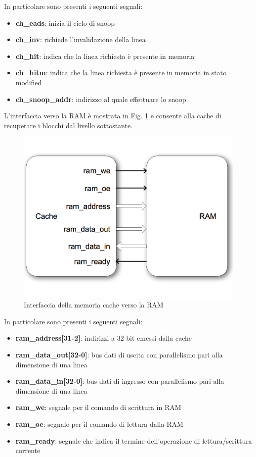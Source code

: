 In particolare sono presenti i seguenti segnali:
\begin{itemize}
\item \textbf{ch\_eads}: inizia il ciclo di snoop
\item \textbf{ch\_inv}: richiede l'invalidazione della linea
\item \textbf{ch\_hit}: indica che la linea richiesta \`e presente in memoria
\item \textbf{ch\_hitm}: indica che la linea richiesta \`e presente in memoria in stato modified
\item \textbf{ch\_snoop\_addr}: indirizzo al quale effettuare lo snoop
\end{itemize}


L'interfaccia verso la RAM \`e mostrata in Fig. \ref{fig:int_ram} e consente alla cache di recuperare i blocchi dal livello sottostante.\\

\begin{figure}[h!]
\centering
\includegraphics[width=\textwidth]{img/cache/ram.png}
\caption{Interfaccia della memoria cache verso la RAM}
\label{fig:int_ram}
\end{figure}

In particolare sono presenti i seguenti segnali:
\begin{itemize} %
\item \textbf{ram\_address[31-2]}: indirizzi a 32 bit emessi dalla cache
\item \textbf{ram\_data\_out[32-0]}: bus dati di uscita con parallelismo pari alla dimensione di una linea
\item \textbf{ram\_data\_in[32-0]}: bus dati di ingresso con parallelismo pari alla dimensione di una linea
\item \textbf{ram\_we}: segnale per il comando di scrittura in RAM
\item \textbf{ram\_oe}: segnale per il comando di lettura dalla RAM
\item \textbf{ram\_ready}: segnale che indica il termine dell'operazione di lettura/scrittura corrente
\end{itemize}


